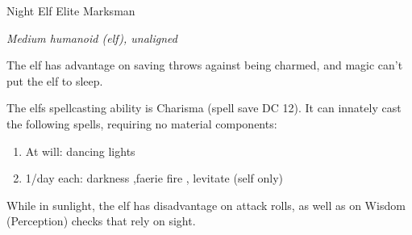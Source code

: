 \begin{monsterbox}{Night Elf Elite Marksman}
	\begin{hangingpar}
		\textit{Medium humanoid (elf), unaligned}
	\end{hangingpar}
	\dndline%
	\basics[%
	armorclass = 18,
	hitpoints  = 71,
	speed      = 30 ft
	]
	\dndline%
	\stats[
	STR = \stat{12}, %
	DEX = \stat{19},
	CON = \stat{14},
	INT = \stat{11},
	WIS = \stat{13},
	CHA = \stat{13}
	]
	\dndline%
	\details[%
	savingthrows = {Dex +7, Con +5, Wis +4},
	skills = {Perception +4, Stealth +10},
	senses = {darkvision 120 ft., passive perception 14},
	languages = {Elvish, undercommon, common},
	challenge = 5 (1800 XP)
	]
	\dndline%
	\begin{monsteraction}
		The elf has advantage on saving throws against being charmed, and magic can't put the elf to sleep.
	\end{monsteraction}	
	\begin{monsteraction}
		The elfs spellcasting ability is Charisma (spell save DC 12). It can innately cast the following spells, requiring no material components:
		\begin{enumerate}
			\item At will: dancing lights
			\item 1/day each: darkness ,faerie fire , levitate (self only)
		\end{enumerate}
	\end{monsteraction}	
	\begin{monsteraction}
		While in sunlight, the elf has disadvantage on attack rolls, as well as on Wisdom (Perception) checks that rely on sight.
	\end{monsteraction}	
	

\end{monsterbox}
